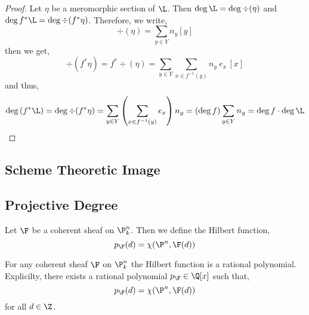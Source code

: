 \documentclass[12pt]{article}
\begin{document}
\begin{proof}
Let $\eta$ be a meromorphic section of $\L$. Then $\deg{\L} = \deg{\div{(\eta)}}$ and $\deg{f^* \L} = \deg{\div{(f^* \eta)}}$.
Therefore, we write,
\[ \div{(\eta)} = \sum_{y \in Y} n_y [y] \]
then we get,
\[ \div{(f^* \eta)} = f^* \div{(\eta)} = \sum_{y \in Y} \sum_{x \in f^{-1}(y)} n_y \: e_x \, [x] \]
and thus,
\[ \deg{(f^* \L)} = \deg{\div{(f^* \eta)}} = \sum_{y \in Y} \left( \sum_{x \in f^{-1}(y)} e_x \right) n_y = (\deg{f}) \sum_{y \in Y} n_y = \deg{f} \cdot \deg{\L} \]
\end{proof}

\subsection{Scheme Theoretic Image}

\subsection{Projective Degree}

\begin{defn}
Let $\F$ be a coherent sheaf on $\P^n_k$. Then we define the Hilbert function,
\[ p_\F(d) = \chi(\P^n, \F(d)) \]
\end{defn}

\begin{prop}
For any coherent sheaf $\F$ on $\P^n_k$ the Hilbert function is a rational polynomial. Explicilty, there exists a rational polynomial $p_\F \in \Q[x]$ such that,
\[ p_\F(d) = \chi(\P^n, \F(d)) \]
for all $d \in \Z$.
\end{prop}
\end{document}
